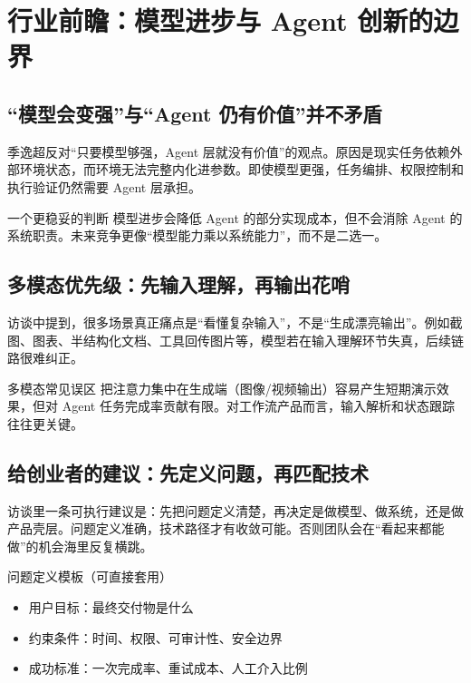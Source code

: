 \documentclass[a4paper]{article}
\begin{document}
\section{行业前瞻：模型进步与 Agent 创新的边界}

\subsection{“模型会变强”与“Agent 仍有价值”并不矛盾}

季逸超反对“只要模型够强，Agent 层就没有价值”的观点。原因是现实任务依赖外部环境状态，而环境无法完整内化进参数。即使模型更强，任务编排、权限控制和执行验证仍然需要 Agent 层承担。

\begin{importantbox}{一个更稳妥的判断}
模型进步会降低 Agent 的部分实现成本，但不会消除 Agent 的系统职责。未来竞争更像“模型能力乘以系统能力”，而不是二选一。
\end{importantbox}

\subsection{多模态优先级：先输入理解，再输出花哨}

访谈中提到，很多场景真正痛点是“看懂复杂输入”，不是“生成漂亮输出”。例如截图、图表、半结构化文档、工具回传图片等，模型若在输入理解环节失真，后续链路很难纠正。

\begin{warningbox}{多模态常见误区}
把注意力集中在生成端（图像/视频输出）容易产生短期演示效果，但对 Agent 任务完成率贡献有限。对工作流产品而言，输入解析和状态跟踪往往更关键。
\end{warningbox}

\subsection{给创业者的建议：先定义问题，再匹配技术}

访谈里一条可执行建议是：先把问题定义清楚，再决定是做模型、做系统，还是做产品壳层。问题定义准确，技术路径才有收敛可能。否则团队会在“看起来都能做”的机会海里反复横跳。

\begin{knowledgebox}{问题定义模板（可直接套用）}
\begin{itemize}
    \item 用户目标：最终交付物是什么
    \item 约束条件：时间、权限、可审计性、安全边界
    \item 成功标准：一次完成率、重试成本、人工介入比例
\end{itemize}
\end{knowledgebox}
\end{document}
